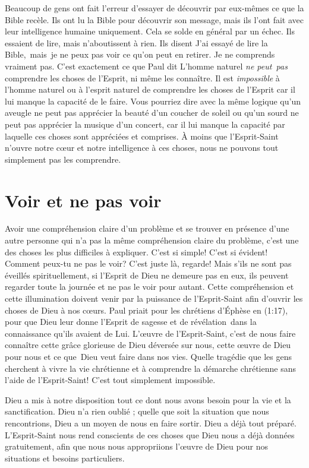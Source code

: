 Beaucoup de gens ont fait l'erreur d'essayer de découvrir par eux-mêmes
 ce que la Bible recèle. Ils ont lu la Bible pour découvrir son message,
 mais ils l'ont fait avec leur intelligence humaine uniquement.
 Cela se solde en général par un échec. Ils essaient de lire,
 mais n'aboutissent à rien. Ils disent\frcolon{}
 \Og J'ai essayé de lire la Bible,~mais~je ne peux pas voir ce qu'on peut
 en retirer. Je ne comprends vraiment pas. \Fg{}
 C'est exactement ce que Paul dit\frcolon{}
 \Og L'homme naturel \emph{ne peut~pas} comprendre les choses de l'Esprit,
 ni même les connaître. \Fg{}
 Il est \emph{impossible} à l'homme naturel ou à l'esprit naturel
 de comprendre les choses de l'Esprit car il lui manque la capacité
 de le faire. Vous pourriez dire avec la même logique qu'un aveugle
 ne peut pas apprécier la beauté d'un coucher de soleil ou qu'un sourd
 ne peut pas apprécier la musique d'un concert, car il lui manque la capacité
 par laquelle ces choses sont appréciées et comprises.
 À moins que l'Esprit-Saint n'ouvre notre cœur et notre intelligence à ces choses,
 nous ne pouvons tout simplement pas les comprendre.


\section{Voir et ne pas voir}

Avoir une compréhension claire d'un problème et se trouver en présence
 d'une autre personne qui n'a pas la même compréhension claire du problème,
 c'est une des choses les plus difficiles à expliquer. C'est si simple!
 C'est si évident! Comment peux-tu ne pas le voir?
 C'est juste là, regarde! Mais s'ils ne sont pas éveillés spirituellement,
 si l'Esprit de Dieu ne demeure pas en eux, ils peuvent regarder
 toute la journée et ne pas le voir pour autant.
 Cette compréhension et cette illumination doivent venir par la puissance
 de l'Esprit-Saint afin d'ouvrir les choses de Dieu à nos cœurs.
 Paul priait pour les chrétiens d'Éphèse en (1:17),
 pour que Dieu leur donne l'Esprit de sagesse et de révélation~dans la
 connaissance qu'ils avaient de Lui.
 L'œuvre de l'Esprit-Saint, c'est de nous faire
 connaître cette grâce glorieuse de Dieu déversée sur nous,
 cette œuvre de Dieu pour nous et ce que~Dieu veut faire dans nos vies.
 Quelle tragédie que les gens cherchent à vivre la vie chrétienne
 et à comprendre la démarche chrétienne sans l'aide de l'Esprit-Saint!
 C'est tout simplement impossible.

Dieu a mis à notre disposition tout ce dont nous avons besoin pour la vie
 et la sanctification. Dieu n'a rien oublié ; quelle que soit la situation
 que nous rencontrions, Dieu a un moyen de nous en faire sortir.
 Dieu a déjà tout préparé. L'Esprit-Saint nous rend conscients
 de ces choses que Dieu nous a déjà données gratuitement,
 afin que nous nous appropriions l'œuvre de Dieu pour nos
 situations et besoins particuliers.

